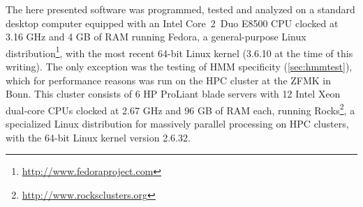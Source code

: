 The here presented software was programmed, tested and analyzed on a standard
desktop computer equipped with an Intel \mbox{Core 2 Duo} E8500 CPU clocked at
3.16 GHz and 4 GB of RAM running Fedora, a general-purpose Linux
distribution\footnote{\url{http://www.fedoraproject.com}}, with the most recent
64-bit Linux kernel (3.6.10 at the time of this writing). The only exception was
the testing of HMM specificity (\autoref{sec:hmmtest}), which for performance
reasons was run on the HPC cluster at the ZFMK in Bonn. This cluster consists of
6 HP ProLiant blade servers with 12 Intel Xeon dual-core CPUs clocked at 2.67
GHz and 96 GB of RAM each, running
Rocks\footnote{\url{http://www.rocksclusters.org}}, a specialized Linux
distribution for massively parallel processing on HPC clusters, with the 64-bit
Linux kernel version 2.6.32.
